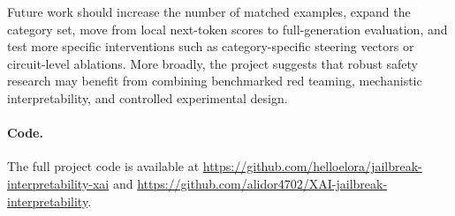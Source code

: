 \documentclass{article}
\begin{document}
Future work should increase the number of matched examples, expand the category set, move from local next-token scores to full-generation evaluation, and test more specific interventions such as category-specific steering vectors or circuit-level ablations. More broadly, the project suggests that robust safety research may benefit from combining benchmarked red teaming, mechanistic interpretability, and controlled experimental design.

\paragraph{Code.} The full project code is available at \url{https://github.com/helloelora/jailbreak-interpretability-xai} and \url{https://github.com/alidor4702/XAI-jailbreak-interpretability}.



\end{document}
